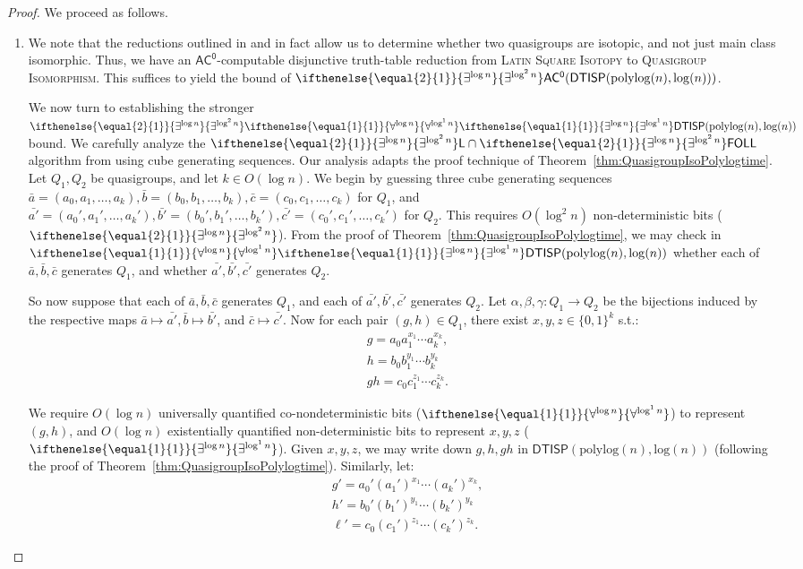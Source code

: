 \documentclass{theoretics}
\newcommand{\algprobm}[1]{\textsc{#1}\xspace}
\newcommand{\betacc}[1]{\ifthenelse{\equal{#1}{1}}{\exists^{\log n}}{\exists^{\log^{#1}n}}} %
\newcommand{\alphacc}[1]{\ifthenelse{\equal{#1}{1}}{\forall^{\log n}}{\forall^{\log^{#1}n}}} %
\newcommand*{\ComplexityClass}[1]{\ensuremath{\mathsf{#1}}\xspace}
\newcommand{\DTISP}{\ComplexityClass{DTISP}}
\newcommand{\DTISPpll}{\ensuremath{\DTISP(\mathrm{polylog}(n),\mathrm{log}(n))}\xspace}
\newcommand*{\LogSpace}{\ComplexityClass{L}}
\newcommand{\ACz}{\ComplexityClass{AC^0}}
\newcommand{\FOLL}{\ComplexityClass{FOLL}}
\begin{document}
\begin{proof}
We proceed as follows.
\begin{enumerate}[label=(\alph*)]
\item We note that the reductions outlined in \cite[Theorem~2]{MillerTarjan} and \cite[Remark~1.6]{LevetLatinSquares} in fact allow us to determine whether two quasigroups are isotopic, and not just main class isomorphic. Thus, we have an $\ACz$-computable disjunctive truth-table reduction from \algprobm{Latin Square Isotopy} to \algprobm{Quasigroup Isomorphism}. This suffices to yield the bound of $\betacc{2}\ACz(\DTISPpll)$. 

We now turn to establishing the stronger $\betacc{2}\alphacc{1}\betacc{1}\DTISPpll$ bound. We carefully analyze the $\betacc{2}\LogSpace \cap \betacc{2}\FOLL$ algorithm from \cite[Section~3]{LevetLatinSquares} using cube generating sequences. Our analysis adapts the proof technique of Theorem~\ref{thm:QuasigroupIsoPolylogtime}. Let $Q_1, Q_2$ be quasigroups, and let $k \in O(\log n)$. We begin by guessing three cube generating sequences $\bar{a} = (a_0, a_1, \ldots, a_k), \bar{b} = (b_0, b_1, \ldots, b_k), \bar{c} = (c_0, c_1, \ldots, c_k)$ for $Q_1$, and $\bar{a'} = (a_{0}', a_{1}', \ldots, a_{k}'), \bar{b'} = (b_{0}', b_{1}', \ldots, b_{k}'),\bar{c'} = (c_{0}', c_{1}', \ldots, c_{k}')$ for $Q_2$. This requires $O(\log^2 n)$ non-deterministic bits ($\betacc{2}$). From the proof of Theorem~\ref{thm:QuasigroupIsoPolylogtime}, we may check in $\alphacc{1}\betacc{1}\DTISPpll$ whether each of $\bar{a}, \bar{b}, \bar{c}$ generates $Q_1$, and whether $\bar{a'}, \bar{b'}, \bar{c'}$ generates $Q_2$. 

So now suppose that each of $\bar{a}, \bar{b}, \bar{c}$ generates $Q_1$, and each of $\bar{a'}, \bar{b'}, \bar{c'}$ generates $Q_2$. Let $\alpha, \beta, \gamma : Q_1 \to Q_2$ be the bijections induced by the respective maps $\bar{a} \mapsto \bar{a'}, \bar{b} \mapsto \bar{b'}$, and $\bar{c} \mapsto \bar{c'}$. Now for each pair $(g, h) \in Q_1$, there exist $x, y, z \in \{0,1\}^{k}$ s.t.:
\begin{align*}
&g = a_{0}a_{1}^{x_{1}} \cdots a_{k}^{x_{k}}, \\
&h = b_{0}b_{1}^{y_{1}} \cdots b_{k}^{y_{k}} \\
&gh = c_{0}c_{1}^{z_{1}} \cdots c_{k}^{z_{k}}.
\end{align*}

We require $O(\log n)$ universally quantified co-nondeterministic bits ($\alphacc{1}$) to represent $(g, h)$, and $O(\log n)$ existentially quantified non-deterministic bits to represent $x, y, z$ ($\betacc{1}$). Given $x, y, z$, we may write down $g, h, gh$ in $\DTISPpll$ (following the proof of Theorem~\ref{thm:QuasigroupIsoPolylogtime}). Similarly, let:
\begin{align*}
&g' = a_{0}'(a_{1}')^{x_{1}} \cdots (a_{k}')^{x_{k}}, \\
&h' = b_{0}'(b_{1}')^{y_{1}} \cdots (b_{k}')^{y_{k}} \\
&\ell' = c_{0}(c_{1}')^{z_{1}} \cdots (c_{k}')^{z_{k}}.
\end{align*}


\end{enumerate}
\end{proof}
\end{document}
